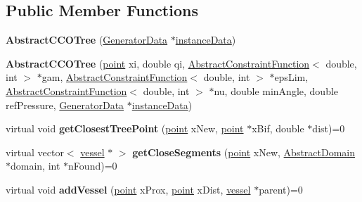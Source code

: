 \subsection*{Public Member Functions}
\begin{DoxyCompactItemize}
\item 
\mbox{\label{class_abstract_c_c_o_tree_a2972193344d6011d55b001b680a95e3e}} 
{\bfseries Abstract\+C\+C\+O\+Tree} (\mbox{\hyperlink{class_generator_data}{Generator\+Data}} $\ast$\mbox{\hyperlink{class_abstract_c_c_o_tree_afd240b7fad46ddf0a2ed78558cc9b9ca}{instance\+Data}})
\item 
\mbox{\label{class_abstract_c_c_o_tree_ae04e7c0b919b99ac4e0cb048dd428641}} 
{\bfseries Abstract\+C\+C\+O\+Tree} (\mbox{\hyperlink{structpoint}{point}} xi, double qi, \mbox{\hyperlink{class_abstract_constraint_function}{Abstract\+Constraint\+Function}}$<$ double, int $>$ $\ast$gam, \mbox{\hyperlink{class_abstract_constraint_function}{Abstract\+Constraint\+Function}}$<$ double, int $>$ $\ast$eps\+Lim, \mbox{\hyperlink{class_abstract_constraint_function}{Abstract\+Constraint\+Function}}$<$ double, int $>$ $\ast$nu, double min\+Angle, double ref\+Pressure, \mbox{\hyperlink{class_generator_data}{Generator\+Data}} $\ast$\mbox{\hyperlink{class_abstract_c_c_o_tree_afd240b7fad46ddf0a2ed78558cc9b9ca}{instance\+Data}})
\item 
\mbox{\label{class_abstract_c_c_o_tree_acf6d6fe7be04c166c7eb6403e07b2d78}} 
virtual void {\bfseries get\+Closest\+Tree\+Point} (\mbox{\hyperlink{structpoint}{point}} x\+New, \mbox{\hyperlink{structpoint}{point}} $\ast$x\+Bif, double $\ast$dist)=0
\item 
\mbox{\label{class_abstract_c_c_o_tree_ab1107c525ea8fbe6d8603642cbee8b72}} 
virtual vector$<$ \mbox{\hyperlink{structvessel}{vessel}} $\ast$ $>$ {\bfseries get\+Close\+Segments} (\mbox{\hyperlink{structpoint}{point}} x\+New, \mbox{\hyperlink{class_abstract_domain}{Abstract\+Domain}} $\ast$domain, int $\ast$n\+Found)=0
\item 
\mbox{\label{class_abstract_c_c_o_tree_aa19c55699734d971036a4ab76ce708e8}} 
virtual void {\bfseries add\+Vessel} (\mbox{\hyperlink{structpoint}{point}} x\+Prox, \mbox{\hyperlink{structpoint}{point}} x\+Dist, \mbox{\hyperlink{structvessel}{vessel}} $\ast$parent)=0

\end{DoxyCompactItemize}
